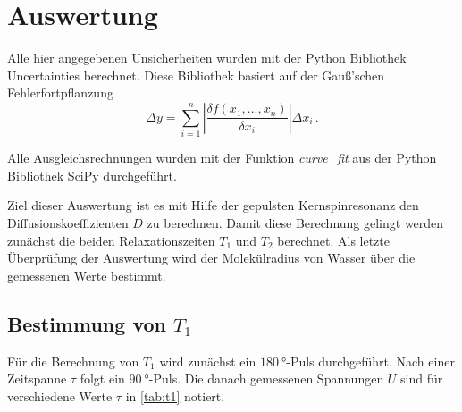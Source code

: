 \section{Auswertung}
\label{sec:Auswertung}

Alle hier angegebenen Unsicherheiten wurden mit der Python Bibliothek Uncertainties berechnet.\cite{uncertainties}
Diese Bibliothek basiert auf der Gauß'schen Fehlerfortpflanzung
\begin{equation}
    \Delta y = \sum_{i=1}^n \left| \frac{\delta f(x_1,...,x_n)}{\delta x_i} \right| \Delta x_i \, .
    \label{eq:fehlerrechnung}
\end{equation}

Alle Ausgleichsrechnungen wurden mit der Funktion \textit{curve\_fit} aus der Python Bibliothek SciPy durchgeführt. \cite{scipy}

Ziel dieser Auswertung ist es mit Hilfe der gepulsten Kernspinresonanz den Diffusionskoeffizienten $D$ zu berechnen. 
Damit diese Berechnung gelingt werden zunächst die beiden Relaxationszeiten $T_1$ und $T_2$ berechnet.
Als letzte Überprüfung der Auswertung wird der Molekülradius von Wasser über die gemessenen Werte bestimmt.

\subsection{Bestimmung von \texorpdfstring{$T_1$}{T1}}
\label{ssec:aus1}

Für die Berechnung von $T_1$ wird zunächst ein $\SI{180}{\degree}$-Puls durchgeführt.
Nach einer Zeitspanne $\tau$ folgt ein $\SI{90}{\degree}$-Puls. 
Die danach gemessenen Spannungen $U$ sind für verschiedene Werte $\tau$ in \autoref{tab:t1} notiert. 

